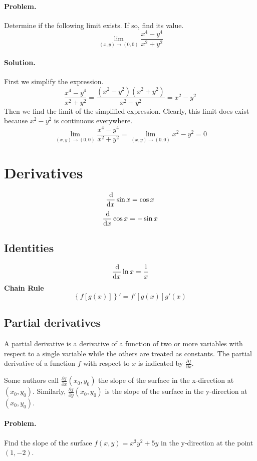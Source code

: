 \documentclass[12pt, oneside]{book}
\newcommand*\reciprocal[1]{\frac{1}{#1}}
\begin{document}
\paragraph{Problem.}
Determine if the following limit exists. If so, find its value.
\[\lim_{\left(x, y\right) \rightarrow \left(0, 0\right)} \frac{x^4 - y^4}{x^2 + y^2}\]
\paragraph{Solution.}
First we simplify the expression.
\[\frac{x^4 - y^4}{x^2 + y^2} = \frac{\left(x^2 - y^2\right) \left(x^2 + y^2\right)}{x^2 + y^2} = x^2 - y^2\]
Then we find the limit of the simplified expression. Clearly, this limit does
exist because \(x^2 - y^2\) is continuous everywhere.
\[\lim_{\left(x, y\right) \rightarrow \left(0, 0\right)}{\frac{x^4 - y^4}{x^2 + y^2}}
= \lim_{\left(x, y\right) \rightarrow \left(0, 0\right)} x^2 - y^2 = 0\]

\section{Derivatives}
\[\frac{\dif}{\dif x} \sin x = \cos x\]
\[\frac{\dif}{\dif x} \cos x = -\sin x\]

\subsection{Identities}
\[\frac{\dif}{\dif x} \ln x = \reciprocal{x}\]
\textbf{Chain Rule}
\[\left\{f\left[g\left(x\right)\right]\right\}'
= f'\left[g\left(x\right)\right] g'\left(x\right)\]

\subsection{Partial derivatives}
A partial derivative is a derivative of a function of two or more variables
with respect to a single variable while the others are treated as constants.
The partial derivative of a function \(f\) with respect to \(x\) is indicated by
\(\frac{\partial f}{\partial x}\).

Some authors call \(\frac{\partial f}{\partial x}\left(x_0, y_0\right)\) the
slope of the surface in the x-direction at \(\left(x_0, y_0\right)\).
Similarly, \(\frac{\partial f}{\partial y}\left(x_0, y_0\right)\) is the slope
of the surface in the y-direction at \(\left(x_0, y_0\right)\).

\paragraph{Problem.}
Find the slope of the surface \(f(x, y) = x^{3}y^{2} + 5y\) in the y-direction at the point \((1, -2)\).
\end{document}
